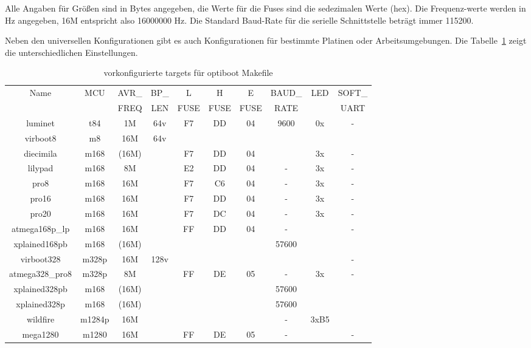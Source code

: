 Alle Angaben für Größen sind in Bytes angegeben, die Werte für die Fuses sind die sedezimalen
Werte (hex). Die Frequenz-werte werden in Hz angegeben, 16M entspricht also 16000000 Hz.
Die Standard Baud-Rate für die serielle Schnittstelle beträgt immer 115200.

Neben den universellen Konfigurationen gibt es auch Konfigurationen für bestimmte
Platinen oder Arbeitsumgebungen.
Die Tabelle~\ref{tab:boards} zeigt die unterschiedlichen Einstellungen.

\begin{table}[H]
  \begin{center}
    \begin{tabular}{| c | c | c | c | c | c | c | c | c | c | }
    \hline
             Name  & MCU & AVR\_ & BP\_ & L     & H     & E     & BAUD\_ & LED & SOFT\_ \\
                   &     & FREQ  & LEN  &  FUSE & FUSE  &  FUSE & RATE &     & UART \\
    \hline
    \hline
       luminet     & t84 &  1M   & 64v &  F7   &  DD   &  04   & 9600 & 0x  &  -   \\

    \hline
         virboot8  & m8    & 16M & 64v &       &       &       &      &     &      \\
    \hline
       diecimila  &  m168 & (16M) &     &  F7   &  DD   &  04   &      & 3x  &  -   \\
       lilypad    &  m168  & 8M  &      &  E2   &  DD   &  04   &  -   & 3x  &  -   \\
       pro8       &  m168  & 16M &      &  F7   &  C6   &  04   &  -   & 3x  &  -   \\
       pro16      &  m168  & 16M &      &  F7   &  DD   &  04   &  -   & 3x  &  -   \\
       pro20      &  m168  & 16M &      &  F7   &  DC   &  04   &  -   & 3x  &  -   \\
    atmega168p\_lp&  m168  & 16M &      &  FF   &  DD   &  04   &  -   &     &  -   \\
   xplained168pb  &  m168  &(16M)&      &       &       &      & 57600 &     &      \\
    \hline
       virboot328  & m328p & 16M & 128v &       &       &       &      &     &  -   \\
    atmega328\_pro8& m328p & 8M  &      &  FF   &  DE   &  05   &  -   & 3x  &  -   \\
   xplained328pb  &  m168  &(16M)&      &       &       &      & 57600 &     &      \\
   xplained328p   &  m168  &(16M)&      &       &       &      & 57600 &     &      \\
    \hline
        wildfire  & m1284p & 16M &      &       &       &      &   -   & 3xB5 &      \\
    \hline
       mega1280    & m1280 & 16M &      &  FF   &  DE   &  05   &  -   &     &  -   \\
    \hline
    \end{tabular}
  \end{center}
  \caption{vorkonfigurierte targets für optiboot Makefile}
  \label{tab:boards}
\end{table}

